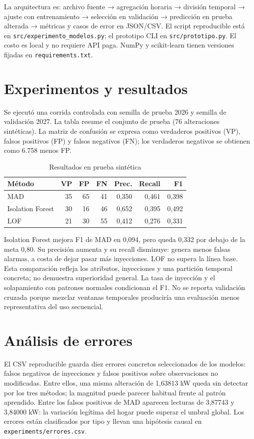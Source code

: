 \documentclass[10pt,twocolumn]{article}
\begin{document}
La arquitectura es: archivo fuente → agregación horaria → división temporal → ajuste con entrenamiento → selección en validación → predicción en prueba alterada → métricas y casos de error en JSON/CSV. El script reproducible está en \texttt{src/experimento\_modelos.py}; el prototipo CLI en \texttt{src/prototipo.py}. El costo es local y no requiere API paga. NumPy y scikit-learn tienen versiones fijadas en \texttt{requirements.txt}.

\section{Experimentos y resultados}
Se ejecutó una corrida controlada con semilla de prueba 2026 y semilla de validación 2027. La tabla resume el conjunto de prueba (76 alteraciones sintéticas). La matriz de confusión se expresa como verdaderos positivos (VP), falsos positivos (FP) y falsos negativos (FN); los verdaderos negativos se obtienen como 6.758 menos FP.
\begin{table}[h]
\centering\small\caption{Resultados en prueba sintética}
\begin{tabular}{lrrrrrr}
\hline
Método & VP & FP & FN & Prec. & Recall & F1\\
\hline
MAD &35&65&41&0,350&0,461&0,398\\
Isolation Forest&30&16&46&0,652&0,395&0,492\\
LOF&21&30&55&0,412&0,276&0,331\\
\hline
\end{tabular}\end{table}

Isolation Forest mejora F1 de MAD en 0,094, pero queda 0,332 por debajo de la meta 0,80. Su precisión aumenta y su recall disminuye: genera menos falsas alarmas, a costa de dejar pasar más inyecciones. LOF no supera la línea base. Esta comparación refleja los atributos, inyecciones y una partición temporal concreta; no demuestra superioridad general. La tasa de inyección y el solapamiento con patrones normales condicionan el F1. No se reporta validación cruzada porque mezclar ventanas temporales produciría una evaluación menos representativa del uso secuencial.

\section{Análisis de errores}
El CSV reproducible guarda diez errores concretos seleccionados de los modelos: falsos negativos de inyecciones y falsos positivos sobre observaciones no modificadas. Entre ellos, una misma alteración de 1,63813 kW queda sin detectar por los tres métodos; la magnitud puede parecer habitual frente al patrón aprendido. Entre los falsos positivos de MAD aparecen lecturas de 3,87743 y 3,84000 kW: la variación legítima del hogar puede superar el umbral global. Los errores están clasificados por tipo y llevan una hipótesis causal en \texttt{experiments/errores.csv}.
\end{document}
